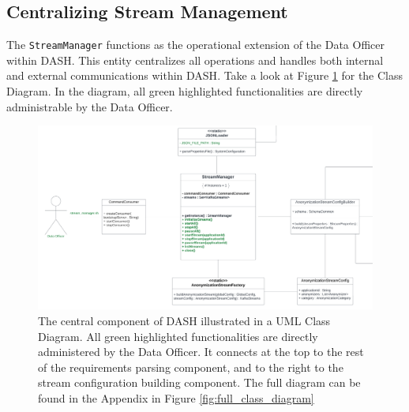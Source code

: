 \subsection{Centralizing Stream Management\label{sec:stream_manager}}
The \texttt{StreamManager} functions as the operational extension of the Data Officer within \ac{DASH}. This entity centralizes all operations and handles both internal and external communications within \ac{DASH}. Take a look at Figure \ref{fig:stream_manager} for the Class Diagram. In the diagram, all green highlighted functionalities are directly administrable by the Data Officer. 

\begin{figure}[ht]
   \begin{adjustbox}{center}
      \includegraphics[width=0.85\pdfpagewidth]{img/Stream_Manager.pdf}
      \end{adjustbox}
      \caption{The central component of DASH illustrated in a UML Class Diagram. All green highlighted functionalities are directly administered by the Data Officer. It connects at the top to the rest of the requirements parsing component, and to the right to the stream configuration building component. The full diagram can be found in the Appendix in Figure \ref{fig:full_class_diagram}\label{fig:stream_manager}}
\end{figure}

